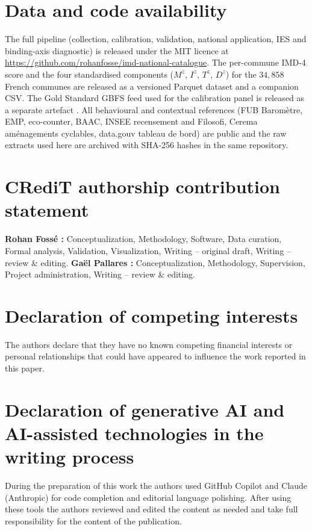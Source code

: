 \documentclass[11pt,a4paper]{article}
\begin{document}
\section*{Data and code availability}

The full pipeline (collection, calibration, validation, national
application, IES and binding-axis diagnostic) is released under
the MIT licence at
\url{https://github.com/rohanfosse/imd-national-catalogue}.  The
per-commune IMD-4 score and the four standardised components
($M^z$, $I^z$, $T^z$, $D^z$) for the $34{,}858$ French communes
are released as a versioned Parquet dataset and a companion CSV.
The Gold Standard GBFS feed used for the calibration panel is
released as a separate artefact \citep{Fosse2026gold}.  All
behavioural and contextual references (FUB Barom\`etre, EMP,
eco-counter, BAAC, INSEE recensement and Filosofi, Cerema
am\'enagements cyclables, data.gouv tableau de bord) are public
and the raw extracts used here are archived with SHA-256 hashes
in the same repository.

\section*{CRediT authorship contribution statement}
\textbf{Rohan Foss\'e :} Conceptualization, Methodology,
Software, Data curation, Formal analysis, Validation,
Visualization, Writing -- original draft, Writing -- review \&
editing.
\textbf{Ga\"el Pallares :} Conceptualization, Methodology,
Supervision, Project administration, Writing -- review \&
editing.

\section*{Declaration of competing interests}
The authors declare that they have no known competing financial
interests or personal relationships that could have appeared to
influence the work reported in this paper.

\section*{Declaration of generative AI and AI-assisted technologies in the writing process}
During the preparation of this work the authors used GitHub
Copilot and Claude (Anthropic) for code completion and
editorial language polishing.  After using these tools the
authors reviewed and edited the content as needed and take full
responsibility for the content of the publication.
\end{document}
